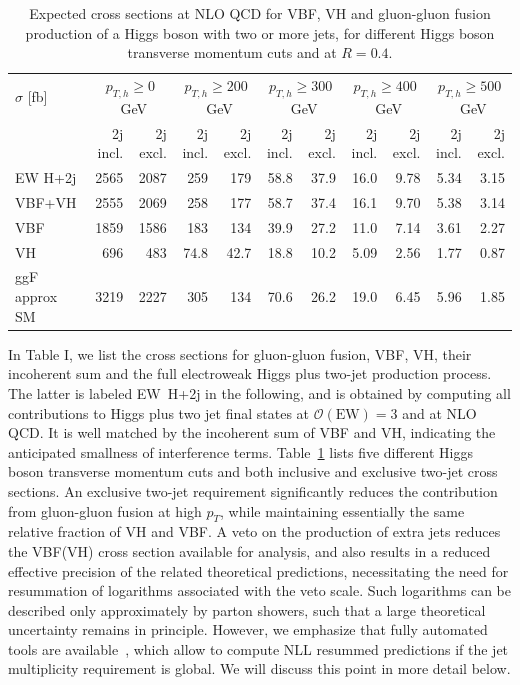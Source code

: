 \documentclass[10pt,prd,fleqn,superscriptaddress,notitlepage,nofootinbib,preprintnumbers,nobalancelastpage]{revtex4-1}
\newcommand{\VBF}{VBF\xspace}
\newcommand{\VH}{VH\xspace}
\begin{document}
\begin{table}[t]
    \centering
    \bgroup
    \def\arraystretch{1.15}
    \setlength\tabcolsep{2.5mm}
    \begin{tabular}{l|rrrrrrrrrr}
        $\sigma$ [fb] & \multicolumn{2}{c}{$p_{T,h}\ge0$~GeV} & \multicolumn{2}{c}{$p_{T,h}\ge200$~GeV} & \multicolumn{2}{c}{$p_{T,h}\ge300$~GeV} & \multicolumn{2}{c}{$p_{T,h}\ge400$~GeV} & \multicolumn{2}{c}{$p_{T,h}\ge500$~GeV} \\
        & 2j incl. & 2j excl. & 2j incl. & 2j excl. & 2j incl. & 2j excl. & 2j incl. & 2j excl. & 2j incl. & 2j excl.\\\hline
        EW H+2j & 2565 & 2087 & 259 & 179 & 58.8 & 37.9 & 16.0 & 9.78 & 5.34 & 3.15 \\
        VBF+VH & 2555 & 2069 & 258 & 177 & 58.7 & 37.4 & 16.1 & 9.70 & 5.38 & 3.14 \\
        VBF & 1859 & 1586 & 183 & 134 & 39.9 & 27.2 & 11.0 & 7.14 & 3.61 & 2.27 \\
        VH & 696 & 483 & 74.8 & 42.7 & 18.8 & 10.2 & 5.09 & 2.56 & 1.77 & 0.87 \\
        ggF approx SM & 3219 & 2227 & 305 & 134 & 70.6 & 26.2 & 19.0 & 6.45 & 5.96 & 1.85
    \end{tabular}
    \egroup
    \caption{Expected cross sections at NLO QCD for \VBF, \VH and gluon-gluon fusion production of a Higgs boson with two or more jets, for different Higgs boson transverse momentum cuts and at $R=0.4$. }
    \label{tab:incl_njets_fraction}
\end{table}

In Table I, we list the cross sections for gluon-gluon fusion, \VBF, \VH, their incoherent sum and the full electroweak Higgs plus two-jet production process. The latter is labeled EW~H+2j in the following, and is obtained by computing all contributions to Higgs plus two jet final states at $\mathcal{O}(\text{EW})=3$ and at NLO QCD. It is well matched by the incoherent sum of \VBF and \VH, indicating the anticipated smallness of interference terms.
Table~\ref{tab:incl_njets_fraction} lists five different Higgs boson transverse momentum cuts and both inclusive and exclusive two-jet cross sections. An exclusive two-jet requirement significantly reduces the contribution from gluon-gluon fusion at high $p_T$, while maintaining essentially the same relative fraction of \VH and \VBF. A veto on the production of extra jets reduces the \VBF (\VH) cross section available for analysis, and also results in a reduced effective precision of the related theoretical predictions, necessitating the need for resummation of logarithms associated with the veto scale. Such logarithms can be described only approximately by parton showers, such that a large theoretical uncertainty remains in principle. However, we emphasize that fully automated tools are available~\cite{Gerwick:2014gya,Baberuxki:2019ifp,Baron:2020xoi,Caletti:2021oor}, which allow to compute NLL resummed predictions if the jet multiplicity requirement is global. We will discuss this point in more detail below.
\end{document}
